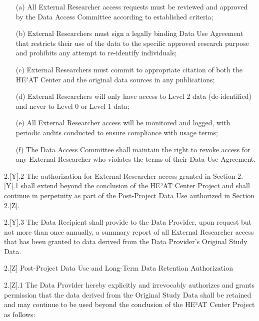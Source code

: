 \documentclass[12pt,letterpaper]{article}
\newcommand{\added}[1]{\textcolor{addcolor}{#1}}
\begin{document}
\added{\begin{enumerate}
\item[(a)] All External Researcher access requests must be reviewed and approved by the Data Access Committee according to established criteria;
   
\item[(b)] External Researchers must sign a legally binding Data Use Agreement that restricts their use of the data to the specific approved research purpose and prohibits any attempt to re-identify individuals;
   
\item[(c)] External Researchers must commit to appropriate citation of both the HE²AT Center and the original data sources in any publications;
   
\item[(d)] External Researchers will only have access to Level 2 data (de-identified) and never to Level 0 or Level 1 data;
   
\item[(e)] All External Researcher access will be monitored and logged, with periodic audits conducted to ensure compliance with usage terms;
   
\item[(f)] The Data Access Committee shall maintain the right to revoke access for any External Researcher who violates the terms of their Data Use Agreement.
\end{enumerate}}

\added{2.[Y].2 The authorization for External Researcher access granted in Section 2.[Y].1 shall extend beyond the conclusion of the HE²AT Center Project and shall continue in perpetuity as part of the Post-Project Data Use authorized in Section 2.[Z].}

\added{2.[Y].3 The Data Recipient shall provide to the Data Provider, upon request but not more than once annually, a summary report of all External Researcher access that has been granted to data derived from the Data Provider's Original Study Data.}

\added{2.[Z] Post-Project Data Use and Long-Term Data Retention Authorization}

\added{2.[Z].1 The Data Provider hereby explicitly and irrevocably authorizes and grants permission that the data derived from the Original Study Data shall be retained and may continue to be used beyond the conclusion of the HE²AT Center Project as follows:}
\end{document}
